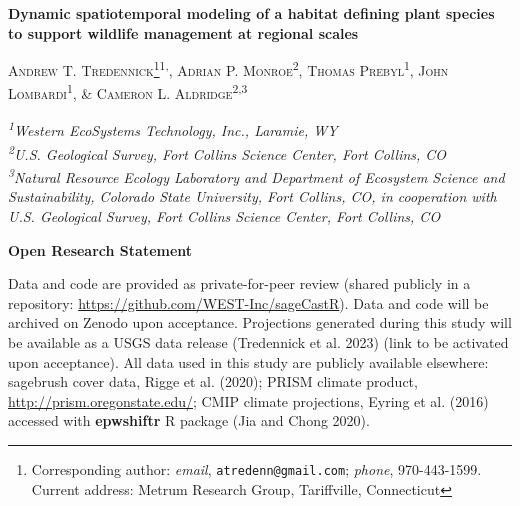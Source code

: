 \documentclass[
  12pt,
]{article}
\author{}
\date{\vspace{-2.5em}}
\begin{document}

\newcommand{\new}{\textcolor{blue}} 
\newcommand{\comm}{\textcolor{ForestGreen}}
\newcommand{\response}{\textcolor{blue}}
\newcommand{\reply}{\textcolor{blue}}
\renewcommand*{\thefootnote}{\fnsymbol{footnote}}

\begin{centering}
\textbf{\Large{Dynamic spatiotemporal modeling of a habitat defining plant species to support wildlife management at regional scales}}

\textsc{\small{Andrew T. Tredennick\footnote{Corresponding author: \textit{email}, \texttt{atredenn@gmail.com}; \textit{phone}, 970-443-1599. Current address: Metrum Research Group, Tariffville, Connecticut}\textsuperscript{1,}, Adrian P. Monroe\textsuperscript{2}, Thomas Prebyl\textsuperscript{1}, John Lombardi\textsuperscript{1}, \& Cameron L. Aldridge\textsuperscript{2,3}}}

\textit{\small{\textsuperscript{1}Western EcoSystems Technology, Inc., Laramie, WY}} \\
\textit{\small{\textsuperscript{2}U.S. Geological Survey, Fort Collins Science Center, Fort Collins, CO}} \\
\textit{\small{\textsuperscript{3}Natural Resource Ecology Laboratory and Department of Ecosystem Science and Sustainability, Colorado State University, Fort Collins, CO, in cooperation with U.S. Geological Survey, Fort Collins Science Center, Fort Collins, CO}}

\end{centering}

\renewcommand*{\thefootnote}{\arabic{footnote}}
\setcounter{footnote}{0}

\bigskip{}

\noindent{}\textbf{Open Research Statement}

\noindent{}Data and code are provided as private-for-peer review (shared publicly in a repository: \url{https://github.com/WEST-Inc/sageCastR}). Data and code will be archived on Zenodo upon acceptance. Projections generated during this study will be available as a USGS data release (Tredennick et al. 2023) (link to be activated upon acceptance). All data used in this study are publicly available elsewhere: sagebrush cover data, Rigge et al. (2020); PRISM climate product, \url{http://prism.oregonstate.edu/}; CMIP climate projections, Eyring et al. (2016) accessed with \textbf{epwshiftr} R package (Jia and Chong 2020).
\end{document}
